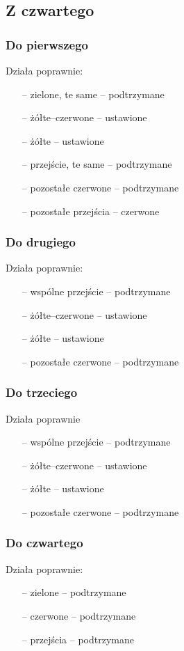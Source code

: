 \documentclass[a4paper, 12pt, titlepage]{article}
\begin{document}
		\subsection{Z czwartego}
			\subsubsection{Do pierwszego}
				Działa poprawnie:
				\begin{itemize}
					\item[--] zielone, te same -- podtrzymane
					\item[--] żółte--czerwone -- ustawione
					\item[--] żółte -- ustawione
					\item[--] przejście, te same -- podtrzymane
					\item[--] pozostałe czerwone -- podtrzymane
					\item[--] pozostałe przejścia -- czerwone
				\end{itemize}
			\subsubsection{Do drugiego}
				Działa poprawnie:
				\begin{itemize}
					\item[--] wspólne przejście -- podtrzymane
					\item[--] żółte--czerwone -- ustawione
					\item[--] żółte -- ustawione
					\item[--] pozostałe czerwone -- podtrzymane					
				\end{itemize}
			\subsubsection{Do trzeciego}
				Działa poprawnie
				\begin{itemize}
					\item[--] wspólne przejście -- podtrzymane
					\item[--] żółte--czerwone -- ustawione
					\item[--] żółte -- ustawione
					\item[--] pozostałe czerwone -- podtrzymane
				\end{itemize}
			\subsubsection{Do czwartego}
				Działa poprawnie:
				\begin{itemize}
					\item[--] zielone -- podtrzymane
					\item[--] czerwone -- podtrzymane
					\item[--] przejścia -- podtrzymane
				\end{itemize}
				\newpage
	\newpage
\end{document}
